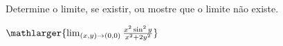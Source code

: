 Determine o limite, se existir, ou mostre que o limite não existe.

$\mathlarger{\lim_{(x,y)\rightarrow(0,0)} \frac{x^2\sin^2y}{x^2+2y^2}}$
